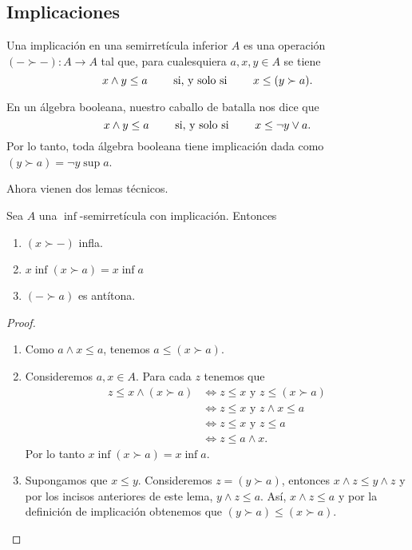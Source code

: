 \subsection{Implicaciones}

Una implicación en una semirretícula inferior $A$ es una operación
$(-\succ -)\colon A\rightarrow A$ tal que, para cualesquiera $a,x,y\in A$ se tiene
\[
  x\wedge y\leq a \qquad\text{ si, y solo si }\qquad x\leq (y\succ a )
.\]

\begin{example}
  En un álgebra booleana, nuestro caballo de batalla nos dice que
  \[
    x\wedge y\leq a \qquad\text{ si, y solo si }\qquad
    x\leq \neg y\vee a
  .\]
  Por lo tanto, toda álgebra booleana tiene implicación dada
  como $(y\succ a)=\neg y\sup a$.
\end{example}

Ahora vienen dos lemas técnicos.
\begin{lemma}\label{imp}
  Sea $A$ una $\inf$-semirretícula con implicación.
  Entonces
  \begin{enumerate}
    \item $(x\succ -)$ infla.
    \item $x\inf(x\succ a) = x\inf a$
    \item $(-\succ a)$ es antítona.
  \end{enumerate}
\end{lemma}
\begin{proof}
    \begin{enumerate}
        \item Como $a\wedge x\leq a$, tenemos
        $a\leq (x\succ a).$
        \item Consideremos $a, x\in A$.
        Para cada $z$ tenemos que 
        \begin{align*}
            z\leq x\wedge (x\succ a)
            & \iff z\leq x \mbox{ y } z\leq (x\succ a)\\
            & \iff z\leq x \mbox{ y } z\wedge x\leq a\\
            & \iff z\leq x \mbox{ y } z\leq a\\
            & \iff z\leq a\wedge x.
        \end{align*}
        Por lo tanto $x\inf(x\succ a) = x\inf a$.
        \item Supongamos que $x\leq y$. Consideremos $z=(y\succ a)$, entonces $x\wedge z\leq y\wedge z$ y por los incisos anteriores de este lema, $y\wedge z\leq a$. Así, $x\wedge z\leq a$ y por la definición de implicación obtenemos que $(y\succ a)\leq (x\succ a)$. 
    \end{enumerate}
\end{proof}

